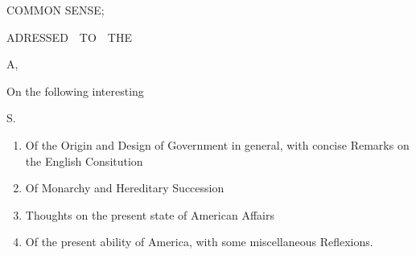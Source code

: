 \documentclass[12pt, twocolumn]{book}
\begin{document}
    \clearpage

    \begin{titlepage}
        \begin{center}
        
            {\fontsize{46pt}{4pt} \selectfont COMMON SENSE;}

            \vspace*{1cm}

            {\scriptsize \lsstyle ADRESSED$\quad$TO$\quad$THE}

            \vspace*{1.2cm}

            {\fontsize{36pt}{4pt} \selectfont {}}

            \vspace*{1cm}

            {\small {}}

            \vspace*{1cm}

            {\fontsize{38pt}{4pt} \selectfont {}A,}

            \vspace*{1cm}

            {\small On the following interesting}

            \vspace*{1cm}

            {\LARGE {} S.}

            \vspace*{0.7cm}

            {\begin{adjustwidth}{3em}{3em}
                \begin{enumerate}[I]
                    \setlength{\itemsep}{10pt}
                    \item Of the Origin and Design of Government in general, with concise Remarks on the English Consitution
                    \item Of Monarchy and Hereditary Succession
                    \item Thoughts on the present state of American Affairs
                    \item Of the present ability of America, with some miscellaneous Reflexions.
                \end{enumerate}
            \end{adjustwidth}}

            \medskip


\end{center}
\end{titlepage}
\end{document}
